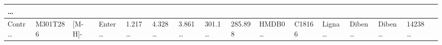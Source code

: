 \documentclass[
]{article}
\begin{document}
\begin{longtable}[]{@{}llllllllllllllll@{}}
\begin{minipage}[b]{0.02\columnwidth}
\ldots{}\strut
\end{minipage}\tabularnewline
\midrule
\endhead
\begin{minipage}[t]{0.04\columnwidth}\raggedright
Contr\ldots{}\strut
\end{minipage} & \begin{minipage}[t]{0.04\columnwidth}\raggedright
M301T286\strut
\end{minipage} & \begin{minipage}[t]{0.04\columnwidth}\raggedright
{[}M-H{]}-\strut
\end{minipage} & \begin{minipage}[t]{0.04\columnwidth}\raggedright
Enter\ldots{}\strut
\end{minipage} & \begin{minipage}[t]{0.04\columnwidth}\raggedright
1.217\ldots{}\strut
\end{minipage} & \begin{minipage}[t]{0.04\columnwidth}\raggedright
4.328\ldots{}\strut
\end{minipage} & \begin{minipage}[t]{0.04\columnwidth}\raggedright
3.861\ldots{}\strut
\end{minipage} & \begin{minipage}[t]{0.04\columnwidth}\raggedright
301.1\ldots{}\strut
\end{minipage} & \begin{minipage}[t]{0.04\columnwidth}\raggedright
285.898\strut
\end{minipage} & \begin{minipage}[t]{0.04\columnwidth}\raggedright
HMDB0\ldots{}\strut
\end{minipage} & \begin{minipage}[t]{0.03\columnwidth}\raggedright
C18166\strut
\end{minipage} & \begin{minipage}[t]{0.04\columnwidth}\raggedright
Ligna\ldots{}\strut
\end{minipage} & \begin{minipage}[t]{0.04\columnwidth}\raggedright
Diben\ldots{}\strut
\end{minipage} & \begin{minipage}[t]{0.04\columnwidth}\raggedright
Diben\ldots{}\strut
\end{minipage} & \begin{minipage}[t]{0.04\columnwidth}\raggedright
14238\ldots{}\strut
\end{minipage} & \begin{minipage}[t]{0.02\columnwidth}\raggedright

\end{minipage}
\end{longtable}
\end{document}
